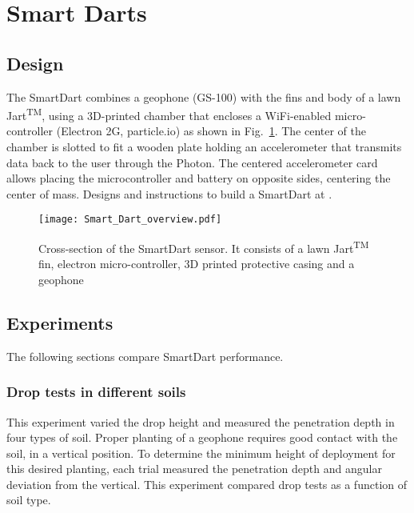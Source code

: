 \section{Smart Darts}\label{sec:SmartDarts}

\subsection{Design}

The SmartDart combines a geophone (GS-100) with the fins and body of a lawn Jart\textsuperscript{TM}, using a 3D-printed chamber that encloses a WiFi-enabled micro-controller (Electron 2G, particle.io) as shown in Fig.~\ref{fig:Smart_Dart_overview}. 
The center of the chamber is slotted to fit a wooden plate holding an accelerometer that transmits data back to the user through the Photon. 
The centered accelerometer card allows placing the microcontroller and battery on opposite sides, centering the center of mass.
Designs and instructions to build a SmartDart at \cite{Victor2016Thingiverse}.



\begin{figure} \centering
{\texttt{[image: Smart\_Dart\_overview.pdf]}}
\caption{Cross-section of the SmartDart sensor. It consists of a lawn  Jart\textsuperscript{TM} fin, electron micro-controller, 3D printed protective casing and a geophone} 
\label{fig:Smart_Dart_overview}
\end{figure}

\subsection{Experiments} 
The following sections compare SmartDart performance.
\subsubsection{ Drop tests in different soils}  
This experiment varied the drop height and measured the penetration depth in four types of soil. 
Proper planting of a geophone requires good contact with the soil, in a vertical position. 
To determine the minimum height of deployment for this desired planting, each trial measured the penetration depth and angular deviation from the vertical. 
This experiment compared drop tests as a function of soil type. 


